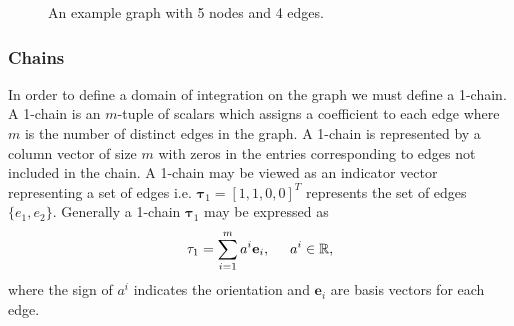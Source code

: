 \begin{figure}
\centering
{} 
\caption{An example graph with 5 nodes and 4 edges.}
\label{fig:example_network}
\end{figure}

\subsubsection{Chains}

In order to define a domain of integration on the graph we must define a 1-chain. A 1-chain is an $m$-tuple of scalars which assigns a coefficient to each edge where $m$ is the number of distinct edges in the graph. A 1-chain is represented by a column vector of size $m$ with zeros in the entries corresponding to edges not included in the chain. A 1-chain may be viewed as an indicator vector representing a set of edges i.e. $\mathbf{\tau}_1 = [1, 1, 0, 0]^T$ represents the set of edges $\{ e_1, e_2 \}$. Generally a 1-chain $\mathbf{\tau}_1$ may be expressed as 
\begin{align}
\mathbf{\tau}_1 =  \sum_{i=1}^m a^i \mathbf{e}_i, \hspace{0.5cm} a^i \in \mathbb{R},
\end{align}
where the sign of $a^i$ indicates the orientation and $\mathbf{e}_i$ are basis vectors for each edge. 

